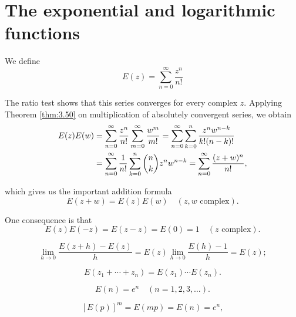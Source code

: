 \section{The exponential and logarithmic functions}
We define
\begin{equation}
    \label{eq:8.25}
    E(z) = 
    \sum_{n=0}^{\infty} \frac{z^n}{n!}
\end{equation}

The ratio test shows that this series converges for every complex $z$. Applying Theorem \ref{thm:3.50} on multiplication of absolutely convergent series, we obtain
\begin{align*}
    E(z) E(w) 
    &= \sum_{n=0}^{\infty} \frac{z^n}{n!} \sum_{m=0}^{\infty} \frac{w^m}{m!}
    = \sum_{n=0}^{\infty} \sum_{k=0}^{n} \frac{z^n w^{n-k}}{k!(n-k)!} \\
    &= \sum_{n=0}^{\infty} \frac{1}{n!} 
    \sum_{k=0}^{n} \protect \binom{n}{k} z^n w^{n-k} 
    = \sum_{n=0}^{\infty} \frac{(z + w)^n}{n!},
\end{align*}

which gives us the important addition formula
\begin{equation}
    \label{eq:8.26}
    E(z + w) = E(z)E(w)
    \quad 
    (z, w \text{ complex}).
\end{equation}

One consequence is that
\begin{equation}
    \label{eq:8.27}
    E(z)E(-z) = E(z - z) = E(0) = 1
    \quad 
    (z \text{ complex}).
\end{equation}


\begin{equation}
    \label{eq:8.28}
    \lim_{h \to 0} \frac{E(z+h) - E(z)}{h} = 
    E(z) \lim_{h \to 0} \frac{E(h) - 1}{h} = 
    E(z);
\end{equation}

\begin{equation}
    \label{eq:8.29}
    E(z_1 + \cdots + z_n) = E(z_1) \cdots E(z_n).
\end{equation}

\begin{equation}
    \label{eq:8.30}
    E(n) = e^n
    \quad (n = 1,2,3,\dots).
\end{equation}

\begin{equation}
    \label{eq:8.31}
    \left[ E(p) \right]^m = E(mp) = E(n) = e^n,
\end{equation}

